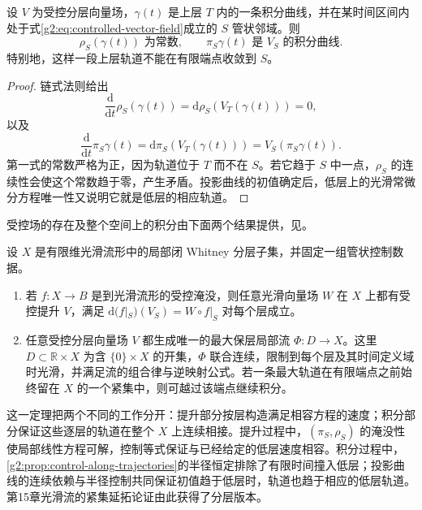 \begin{proposition}\label{g2:prop:control-along-trajectories}
	设 \(V\) 为受控分层向量场，\(\gamma(t)\) 是上层 \(T\) 内的一条积分曲线，并在某时间区间内处于式\eqref{g2:eq:controlled-vector-field}成立的 \(S\) 管状邻域。则
	\[
		\rho_S(\gamma(t))\text{ 为常数},\qquad
		\pi_S\gamma(t)\text{ 是 }V_S\text{ 的积分曲线}.
	\]
	特别地，这样一段上层轨道不能在有限端点收敛到 \(S\)。
\end{proposition}
\begin{proof}
	链式法则给出
	\[
		\frac{\mathrm{d}}{\mathrm{d}t}\rho_S(\gamma(t))
		=\mathrm{d}\rho_S(V_T(\gamma(t)))=0,
	\]
	以及
	\[
		\frac{\mathrm{d}}{\mathrm{d}t}\pi_S\gamma(t)
		=\mathrm{d}\pi_S(V_T(\gamma(t)))
		=V_S(\pi_S\gamma(t)).
	\]
	第一式的常数严格为正，因为轨道位于 \(T\) 而不在 \(S\)。若它趋于 \(S\) 中一点，\(\rho_S\) 的连续性会使这个常数趋于零，产生矛盾。投影曲线的初值确定后，低层上的光滑常微分方程唯一性又说明它就是低层的相应轨道。
\end{proof}

受控场的存在及整个空间上的积分由下面两个结果提供，见\cite[第9—10节]{Mather2012TopologicalStability}。

\begin{theorem}\label{g2:thm:controlled-lifting-flow}
	设 \(X\) 是有限维光滑流形中的局部闭 Whitney 分层子集，并固定一组管状控制数据。
	\begin{enumerate}
		\item 若 \(f:X\to B\) 是到光滑流形的受控淹没，则任意光滑向量场 \(W\) 在 \(X\) 上都有受控提升 \(V\)，满足 \(\mathrm{d}(f|_S)(V_S)=W\circ f|_S\) 对每个层成立。
		\item 任意受控分层向量场 \(V\) 都生成唯一的最大保层局部流 \(\Phi:D\to X\)。这里 \(D\subset\mathbb R\times X\) 为含 \(\{0\}\times X\) 的开集，\(\Phi\) 联合连续，限制到每个层及其时间定义域时光滑，并满足流的组合律与逆映射公式。若一条最大轨道在有限端点之前始终留在 \(X\) 的一个紧集中，则可越过该端点继续积分。
	\end{enumerate}
\end{theorem}

这一定理把两个不同的工作分开：提升部分按层构造满足相容方程的速度；积分部分保证这些逐层的轨道在整个 \(X\) 上连续相接。提升过程中，\((\pi_S,\rho_S)\) 的淹没性使局部线性方程可解，控制等式保证与已经给定的低层速度相容。积分过程中，\cref{g2:prop:control-along-trajectories}的半径恒定排除了有限时间撞入低层；投影曲线的连续依赖与半径控制共同保证初值趋于低层时，轨道也趋于相应的低层轨道。第15章光滑流的紧集延拓论证由此获得了分层版本。

\ProseParagraphBreak

